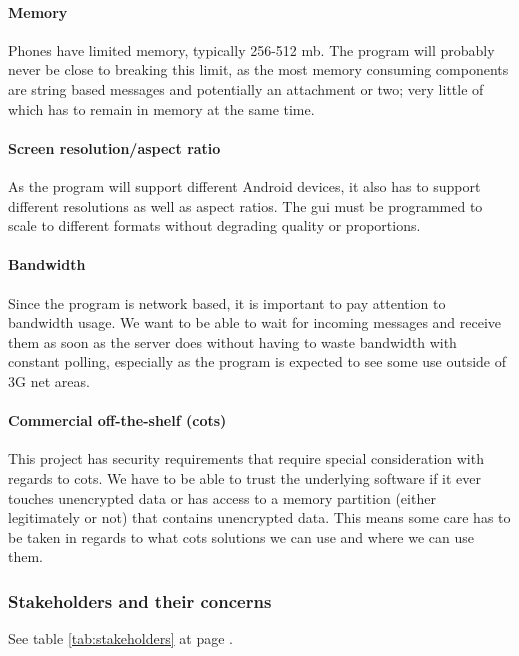 \paragraph{Memory}\hfill
\newline
Phones have limited memory, typically 256-512 \gls{mb}. The program will probably never be close to breaking this limit, as the most memory consuming components are string based messages and potentially an attachment or two; very little of which has to remain in memory at the same time.

\paragraph{Screen resolution/aspect ratio} \hfill
\newline
As the program will support different Android devices, it also has to support different resolutions as well as aspect ratios. The \gls{gui} must be programmed to scale to different formats without degrading quality or proportions.

\paragraph{Bandwidth} \hfill
\newline
Since the program is network based, it is important to pay attention to bandwidth usage. We want to be able to wait for incoming messages and receive them as soon as the server does without having to waste bandwidth with constant polling, especially as the program is expected to see some use outside of 3G net areas.

\paragraph{Commercial off-the-shelf (\gls{cots})} \hfill
\newline
This project has security requirements that require special consideration with regards to \gls{cots}. We have to be able to trust the underlying software if it ever touches unencrypted data or has access to a memory partition (either legitimately or not) that contains unencrypted data. This means some care has to be taken in regards to what \gls{cots} solutions we can use and where we can use them. 

\subsubsection{Stakeholders and their concerns}
See table \ref{tab:stakeholders} at page \pageref{tab:stakeholders}.

